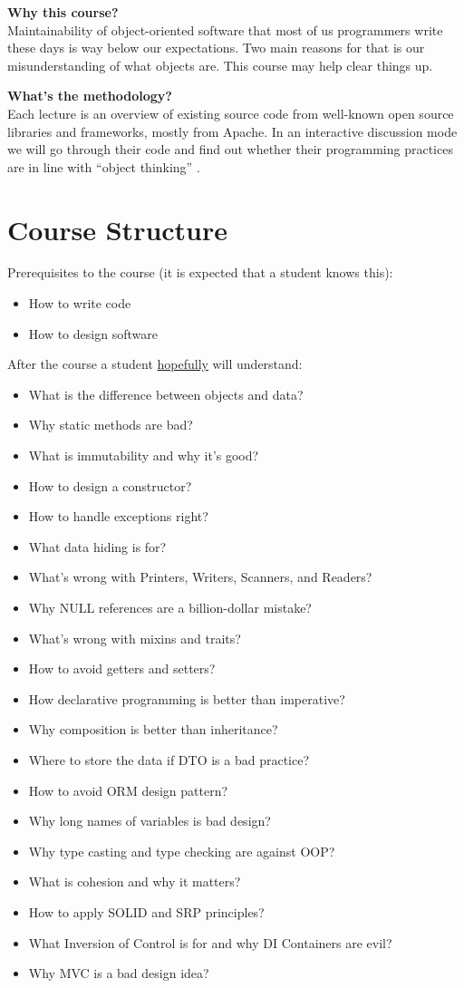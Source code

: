 \documentclass[nobrand,anonymous,nodate,nosecurity]{huawei}
\begin{document}
{\textbf{Why this course?}\\
Maintainability of object-oriented software that most of us programmers write these days is
way below our expectations. Two main reasons for that is our misunderstanding
of what objects are. This course may help clear things up.

\textbf{What's the methodology?}\\
Each lecture is an overview of existing source code from well-known open source
libraries and frameworks, mostly from Apache. In an interactive discussion mode
we will go through their code and find out whether their programming practices
are in line with ``object thinking'' .

\newpage
\section*{Course Structure}

Prerequisites to the course (it is expected that a student knows this):

\begin{itemize}
\item How to write code
\item How to design software
\end{itemize}

After the course a student \ul{hopefully} will understand:

\begin{itemize}
\item What is the difference between objects and data?
\item Why static methods are bad?
\item What is immutability and why it's good?
\item How to design a constructor?
\item How to handle exceptions right?
\item What data hiding is for?
\item What's wrong with Printers, Writers, Scanners, and Readers?
\item Why NULL references are a billion-dollar mistake?
\item What's wrong with mixins and traits?
\item How to avoid getters and setters?
\item How declarative programming is better than imperative?
\item Why composition is better than inheritance?
\item Where to store the data if DTO is a bad practice?
\item How to avoid ORM design pattern?
\item Why long names of variables is bad design?
\item Why type casting and type checking are against OOP?
\item What is cohesion and why it matters?
\item How to apply SOLID and SRP principles?
\item What Inversion of Control is for and why DI Containers are evil?
\item Why MVC is a bad design idea?
\end{itemize}

}
\end{document}
